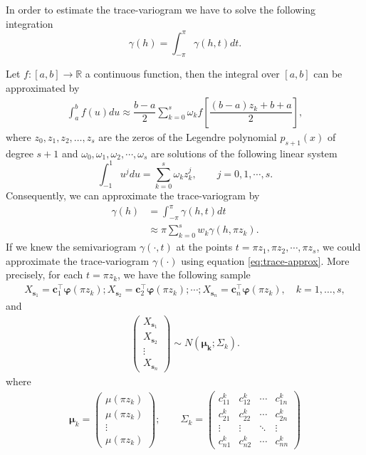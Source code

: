\documentclass[12pt]{interact}
\theoremstyle{plain}%
\theoremstyle{definition}
\theoremstyle{remark}
\begin{document}
In order to estimate the trace-variogram we have to solve the following integration
\begin{equation}
\gamma(h) = \int_{-\pi}^{\pi} \gamma(h,t) dt.
\label{eq:trace-variogram}
\end{equation}

Let \(f:[a,b] \longrightarrow \mathbb{R}\) a continuous function, then the integral over \([a,b]\) can be approximated by
\begin{align*}
\int_{a}^{b} f(u) du \approx \dfrac{b-a}{2} \sum_{k=0}^{s} \omega_k f \left[\dfrac{(b-a)z_k + b +a}{2}\right],
\end{align*}
where \(z_0,z_1, z_2, \dots, z_s\) are the zeros of the Legendre polynomial \(p_{s+1}(x)\) \citep[see][pp.~441]{khuri2003advanced} of degree \(s + 1\) and \(\omega_0,\omega_1, \omega_2, \cdots, \omega_s\) are solutions of the following linear system
\begin{equation*}
\int_{-1}^{1} u^j du= \sum_{k=0}^{s} \omega_k z_k^j, \qquad j=0,1, \cdots, s.
\end{equation*}
Consequently, we can approximate the trace-variogram by
\begin{align} 
\nonumber \gamma(h) &= \int_{-\pi}^{\pi} \gamma(h, t)dt \\
&\approx  \pi \sum_{k=0}^{s} w_k \gamma \left( h, \pi z_k \right).
\label{eq:trace-approx}
\end{align}
If we knew the semivariogram \(\gamma(\cdot,t)\) at the points \(t=\pi z_1, \pi z_2, \cdots, \pi z_s\), we could approximate the trace-variogram \(\gamma(\cdot)\) using equation \eqref{eq:trace-approx}. More precisely, for each \(t=\pi z_k\), we have the following sample
\begin{align*}
X_{\bm{s}_1} = \bm{c}_1^\top \bm{\varphi}(\pi z_k); X_{\bm{s}_2} = \bm{c}_2^\top \bm{\varphi}(\pi z_k); \cdots; X_{\bm{s}_n} = \bm{c}_n^\top \bm{\varphi}(\pi z_k), \quad k=1, \dots, s,
\end{align*}
and
\begin{align*}
\begin{pmatrix}
X_{\bm{s}_1}\\
X_{\bm{s}_2}\\
\vdots\\
X_{\bm{s}_n}
\end{pmatrix}
\sim N\left(\bm{\mu_k};\Sigma_k \right).
\end{align*}
where
\begin{align*}
\bm{\mu}_k = \begin{pmatrix}
\mu(\pi z_k)\\
\mu(\pi z_k)\\
\vdots\\
\mu(\pi z_k)
\end{pmatrix};
\qquad
\Sigma_k = \begin{pmatrix}
c_{11}^k & c_{12}^k & \cdots & c_{1n}^k\\
c_{21}^k & c_{22}^k & \cdots & c_{2n}^k\\
\vdots & \vdots & \ddots & \vdots \\
c_{n1}^k & c_{n2}^k & \cdots & c_{nn}^k
\end{pmatrix}
\end{align*}
\end{document}
